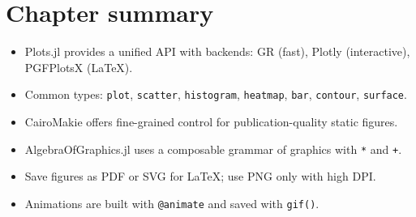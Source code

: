 \section{Chapter summary}

\begin{itemize}
  \item Plots.jl provides a unified API with backends: GR (fast), Plotly (interactive), PGFPlotsX (\LaTeX).
  \item Common types: \texttt{plot}, \texttt{scatter}, \texttt{histogram}, \texttt{heatmap}, \texttt{bar}, \texttt{contour}, \texttt{surface}.
  \item CairoMakie offers fine-grained control for publication-quality static figures.
  \item AlgebraOfGraphics.jl uses a composable grammar of graphics with \texttt{*} and \texttt{+}.
  \item Save figures as PDF or SVG for \LaTeX{}; use PNG only with high DPI.
  \item Animations are built with \texttt{@animate} and saved with \texttt{gif()}.
\end{itemize}
